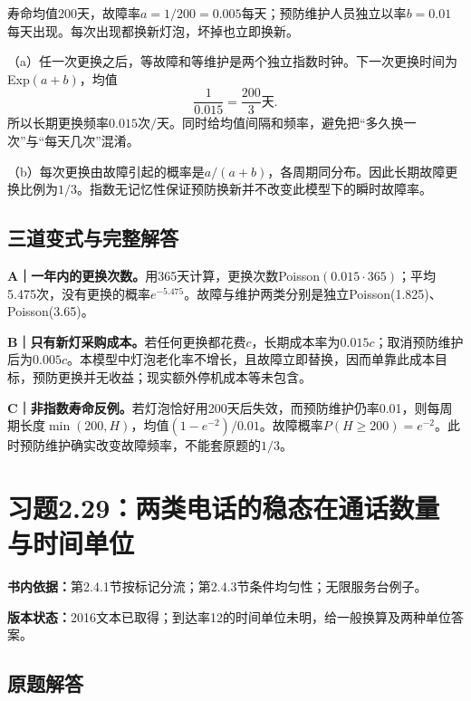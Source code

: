 \documentclass[
  11pt,
  a4paper,
  UTF8,fontset=fandol]{ctexart}
\let\OldSection\section
\renewcommand{\section}{\Needspace{7\baselineskip}\OldSection}
\let\OldSubsection\subsection
\renewcommand{\subsection}{\Needspace{5\baselineskip}\OldSubsection}
\begin{document}
寿命均值200天，故障率\(a=1/200=0.005\)每天；预防维护人员独立以率\(b=0.01\)每天出现。每次出现都换新灯泡，坏掉也立即换新。

（a）任一次更换之后，等故障和等维护是两个独立指数时钟。下一次更换时间为Exp\((a+b)\)，均值
\[\boxed{\frac1{0.015}=\frac{200}{3}\text{天}}.\]
所以长期更换频率\(\boxed{0.015\text{次/天}}\)。同时给均值间隔和频率，避免把``多久换一次''与``每天几次''混淆。

（b）每次更换由故障引起的概率是\(a/(a+b)\)，各周期同分布。因此长期故障更换比例为\(\boxed{1/3}\)。指数无记忆性保证预防换新并不改变此模型下的瞬时故障率。

\subsection{三道变式与完整解答}\label{ux4e09ux9053ux53d8ux5f0fux4e0eux5b8cux6574ux89e3ux7b54-27}

\textbf{A｜一年内的更换次数。}用365天计算，更换次数Poisson\((0.015\cdot365)\)；平均5.475次，没有更换的概率\(e^{-5.475}\)。故障与维护两类分别是独立Poisson(1.825)、Poisson(3.65)。

\textbf{B｜只有新灯采购成本。}若任何更换都花费\(c\)，长期成本率为\(0.015c\)；取消预防维护后为\(0.005c\)。本模型中灯泡老化率不增长，且故障立即替换，因而单靠此成本目标，预防更换并无收益；现实额外停机成本等未包含。

\textbf{C｜非指数寿命反例。}若灯泡恰好用200天后失效，而预防维护仍率0.01，则每周期长度\(\min(200,H)\)，均值\((1-e^{-2})/0.01\)。故障概率\(P(H\ge200)=e^{-2}\)。此时预防维护确实改变故障频率，不能套原题的\(1/3\)。

\newpage

\section{习题2.29：两类电话的稳态在通话数量与时间单位}\label{ux4e60ux98982.29ux4e24ux7c7bux7535ux8bddux7684ux7a33ux6001ux5728ux901aux8bddux6570ux91cfux4e0eux65f6ux95f4ux5355ux4f4d}

\textbf{书内依据：}第2.4.1节按标记分流；第2.4.3节条件均匀性；无限服务台例子。

\textbf{版本状态：}2016文本已取得；到达率12的时间单位未明，给一般换算及两种单位答案。

\subsection{原题解答}\label{ux539fux9898ux89e3ux7b54-28}
\end{document}
